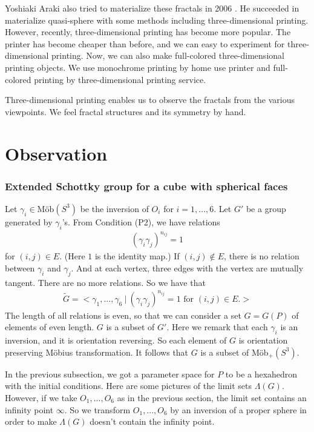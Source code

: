 \documentclass[suppldata, dvipdfmx]{interact}
\theoremstyle{plain}%
\theoremstyle{definition}
\theoremstyle{remark}
\theoremstyle{problemstyle}
\begin{document}
Yoshiaki Araki also tried to materialize these fractals in 2006
\cite{araki2006materializing}.
He succeeded in materialize quasi-sphere with some methods including
three-dimensional printing.
However, recently, three-dimensional printing has become more popular.
The printer has become cheaper than before, and we can easy to
experiment for three-dimensional printing.
Now, we can also make full-colored three-dimensional printing objects.
We use monochrome printing by home use printer and full-colored
printing by three-dimensional printing service.

Three-dimensional printing enables us to observe the fractals from the
various viewpoints.
We feel fractal structures and its symmetry by hand.

\section{Observation}

\subsubsection{Extended Schottky group for a cube with spherical faces}\label{extend}

Let $\gamma_i \in \text{M\"ob}(S^3)$ be the inversion of $O_i$ for $i =
1,...,6$.
Let $G'$ be a group generated by $\gamma_i$'s. From Condition (P2), we
have relations
\begin{align*}
 (\gamma_i \gamma_j)^{n_{ij}} = 1
\end{align*}
for $(i, j) \in E.$ (Here $1$ is the identity map.) If $(i, j) \notin E$,
there is no relation between $\gamma_i$ and $\gamma_j$.
And at each vertex, three edges with the vertex are mutually tangent.
There are no more relations. So we have that
\begin{align*}
 \tilde G = <\gamma_1, ...,\gamma_6~|~(\gamma_i\gamma_j)^{n_{ij}} = 1 \text{ for }
 (i, j) \in E.>
\end{align*}
The length of all relations is even, so that we can consider a set $G = G(P)$
of elements of even length. $G$ is a subset of $G'$. Here we remark
that each $\gamma_i$ is an inversion, and it is orientation reversing. So
each element of $G$ is orientation preserving M\"obius transformation.
It follows that $G$ is a subset of M\"ob$_+(S^3)$.

In the previous subsection, we got a parameter space for $P$ to be a
hexahedron with the initial conditions. Here are some pictures of the
limit sets $\Lambda(G)$. However, if we take $O_1, ..., O_6$ as in the
previous section, the limit set contains an infinity point $\infty$. So
we transform $O_1, ..., O_6$ by an inversion of a proper sphere in
order to make $\Lambda(G)$ doesn't contain the infinity point.
\end{document}
